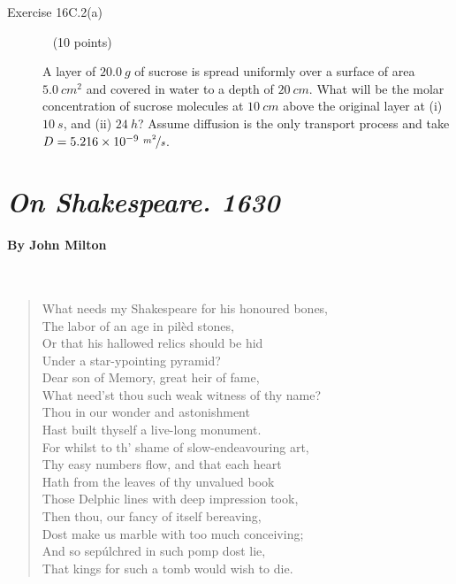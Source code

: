 \documentclass[12pt, openany, letterpaper]{memoir}
\begin{document}
\begin{description}
	\vspace{23em}	
	\item [Exercise 16C.2(a)] ~ (10 points)	

	A layer of $20.0~g$ of sucrose is spread uniformly over a surface of area $5.0~cm^2$ and covered in water to a depth of $20~cm$. What will be the molar concentration of sucrose molecules at $10~cm$ above the original layer at (i) $10~s$, and (ii) $24~h$? Assume diffusion is the only transport process and take $D=5.216\times10^{-9}~\nicefrac{m^2}{s}$.
\end{description}
\newpage
\pagestyle{empty}
\addtocounter{page}{-1}	
\section*{\emph{On Shakespeare. 1630}}
\paragraph{By John Milton}~
\begin{verse}
	What needs my Shakespeare for his honoured bones,\\
	The labor of an age in pilèd stones,\\
	Or that his hallowed relics should be hid\\
	Under a star-ypointing pyramid?\\
	Dear son of Memory, great heir of fame,\\
	What need’st thou such weak witness of thy name?\\
	Thou in our wonder and astonishment\\
	Hast built thyself a live-long monument.\\
	For whilst to th’ shame of slow-endeavouring art,\\
	Thy easy numbers flow, and that each heart\\
	Hath from the leaves of thy unvalued book\\
	Those Delphic lines with deep impression took,\\ 
	Then thou, our fancy of itself bereaving,\\
	Dost make us marble with too much conceiving;\\
	And so sepúlchred in such pomp dost lie,\\
	That kings for such a tomb would wish to die.
\end{verse}
\end{document}
